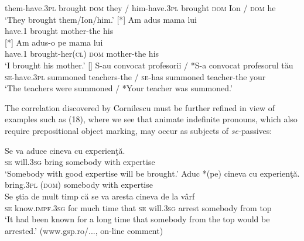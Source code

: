 \documentclass[output=paper]{langsci/langscibook}
\begin{document}
\begin{xlista}[c{'}{'}.]
{         them-have.\textsc{3pl} brought \textsc{dom} they /  him-have.\textsc{3pl} brought \textsc{dom} Ion /  \textsc{dom} he\\
    \glt ‘They brought them/Ion/him.’}
    [*]{
    \gll Am      adus     mama         lui \\
         have.\textsc{1} brought mother-the his\\
    }
    [*]{
     \gll Am      adus-o               pe    mama         lui \\
           have.\textsc{1} brought-her(\textsc{cl}) \textsc{dom} mother-the his \\
     \glt       ‘I brought his mother.’
    }
    []{
    \gll S-au            convocat   profesorii     / *S-a convocat        profesorul   tău \\
         \textsc{se-}have.\textsc{3pl} summoned teachers-the / \textsc{se-}has summoned teacher-the your \\
    \glt ‘The teachers were summoned / *Your teacher was summoned.’}
    \end{xlista}
\z

The correlation discovered by Cornilescu must be further refined in view of examples such as (18), where we see that animate indefinite pronouns, which also require prepositional object marking, may occur as subjects of \textit{se-}passives:

\ea%
    \label{ex:giurgea:18}
    \ea
    \gll  Se va           aduce  cineva       cu    experienţă.\\
         \textsc{se} will.\textsc{3sg}  bring   somebody with expertise\\
    \glt ‘Somebody with good expertise will be brought.’
    \ex
    \gll Aduc      *(pe)   cineva        cu    experienţă.\\
         bring.\textsc{3pl} (\textsc{dom}) somebody with expertise\\
    \ex
    \gll Se ştia                  de  mult  timp  că   se  va          aresta cineva       de la vârf\\
         \textsc{se} know.\textsc{impf.3sg} for much time that \textsc{se} will.\textsc{3sg} arrest somebody from top\\
    \glt ‘It had been known for a long time that somebody from the top would be arrested.’ (www.gsp.ro/..., on-line comment)
    \z
\z    
\end{document}
